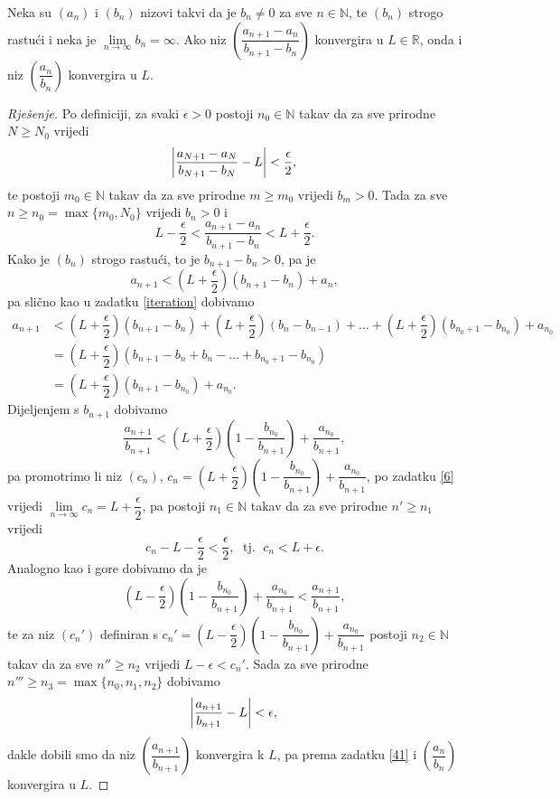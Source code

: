 \begin{exercise} Neka su $(a_n)$ i $(b_n)$ nizovi takvi da je $b_n\neq 0$ za sve $n\in \mathbb{N}$, te $(b_n)$ strogo rastući i neka je $\lim\limits_{n\to \infty}{b_n}=\infty$. Ako niz $\left(\dfrac{a_{n+1}-a_n}{b_{n+1}-b_n}\right)$ konvergira u $L\in \mathbb{R}$, onda i niz $\left(\dfrac{a_n}{b_n}\right)$ konvergira u $L$.
\end{exercise}
\begin{proof}[Rješenje]
Po definiciji, za svaki $\epsilon>0$ postoji $n_0\in \mathbb{N}$ takav da za sve prirodne $N\geq N_0$ vrijedi
$$\abs{\dfrac{a_{N+1}-a_N}{b_{N+1}-b_N}-L}<\dfrac{\epsilon}{2},$$
te postoji $m_0\in \mathbb{N}$ takav da za sve prirodne $m\geq m_0$ vrijedi $b_m>0$. Tada za sve $n\geq n_0=\max\{m_0, N_0\}$ vrijedi $b_n>0$ i
$$L-\dfrac{\epsilon}{2}<\dfrac{a_{n+1}-a_n}{b_{n+1}-b_n}<L+\dfrac{\epsilon}{2}.$$
Kako je $(b_n)$ strogo rastući, to je $b_{n+1}-b_n>0$, pa je
$$a_{n+1}<\left(L+\dfrac{\epsilon}{2}\right)(b_{n+1}-b_n)+a_n,$$
pa slično kao u zadatku \ref{iteration} dobivamo
\begin{align*}
a_{n+1}&<\left(L+\dfrac{\epsilon}{2}\right)(b_{n+1}-b_n)+\left(L+\dfrac{\epsilon}{2}\right)(b_{n}-b_{n-1})+\dots+ \left(L+\dfrac{\epsilon}{2}\right)(b_{n_0+1}-b_{n_0})+a_{n_0}\\
&=\left(L+\dfrac{\epsilon}{2}\right)(b_{n+1}-b_{n}+b_{n}-\dots+b_{n_0+1}-b_{n_0})\\
&=\left(L+\dfrac{\epsilon}{2}\right)(b_{n+1}-b_{n_0})+a_{n_0}.
\end{align*}
Dijeljenjem s $b_{n+1}$ dobivamo
$$\dfrac{a_{n+1}}{b_{n+1}}<\left(L+\dfrac{\epsilon}{2}\right)\left(1-\dfrac{b_{n_0}}{b_{n+1}}\right)+\dfrac{a_{n_0}}{b_{n+1}},$$
pa promotrimo li niz $(c_n)$, $c_n=\left(L+\dfrac{\epsilon}{2}\right)\left(1-\dfrac{b_{n_0}}{b_{n+1}}\right)+\dfrac{a_{n_0}}{b_{n+1}}$,
po zadatku \ref{6} vrijedi $\lim\limits_{n\to \infty}{c_n}=L+\dfrac{\epsilon}{2}$, pa postoji $n_1\in \mathbb{N}$ takav da za sve prirodne $n'\geq n_1$ vrijedi $$c_{n}-L-\dfrac{\epsilon}{2}<\dfrac{\epsilon}{2},\;\text{ tj. }\; c_n<L+\epsilon.$$
Analogno kao i gore dobivamo da je
$$\left(L-\dfrac{\epsilon}{2}\right)\left(1-\dfrac{b_{n_0}}{b_{n+1}}\right)+\dfrac{a_{n_0}}{b_{n+1}}<\dfrac{a_{n+1}}{b_{n+1}},$$
te za niz $(c_n')$ definiran s $c_n'=\left(L-\dfrac{\epsilon}{2}\right)\left(1-\dfrac{b_{n_0}}{b_{n+1}}\right)+\dfrac{a_{n_0}}{b_{n+1}}$ postoji $n_2\in \mathbb{N}$ takav da za sve $n''\geq n_2$ vrijedi $L-\epsilon<c_n'$. Sada za sve prirodne $n'''\geq n_3=\max\{n_0, n_1, n_2\}$ dobivamo
$$\abs{\dfrac{a_{n+1}}{b_{n+1}}-L}<\epsilon,$$
dakle dobili smo da niz $\left(\dfrac{a_{n+1}}{b_{n+1}}\right)$ konvergira k $L$, pa prema zadatku \ref{41} i $\left(\dfrac{a_{n}}{b_{n}}\right)$ konvergira u $L$.
\end{proof}
